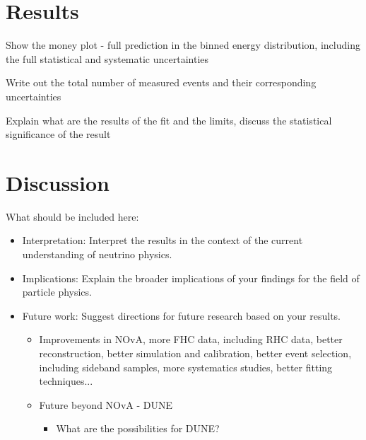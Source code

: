 \section{Results}\label{sec:NuMMResults}

Show the money plot - full prediction in the binned energy distribution, including the full statistical and systematic uncertainties

Write out the total number of measured events and their corresponding uncertainties

Explain what are the results of the fit and the limits, discuss the statistical significance of the result

\section{Discussion}\label{sec:NuMMDiscussion}

What should be included here:
\begin{itemize}
\item Interpretation: Interpret the results in the context of the current understanding of neutrino physics.
\item Implications: Explain the broader implications of your findings for the field of particle physics.
\item Future work: Suggest directions for future research based on your results.
\begin{itemize}
\item Improvements in NOvA, more FHC data, including RHC data, better reconstruction, better simulation and calibration, better event selection, including sideband samples, more systematics studies, better fitting techniques...
\item Future beyond NOvA - DUNE
\begin{itemize}
\item What are the possibilities for DUNE?
\end{itemize}
\end{itemize}
\end{itemize}



